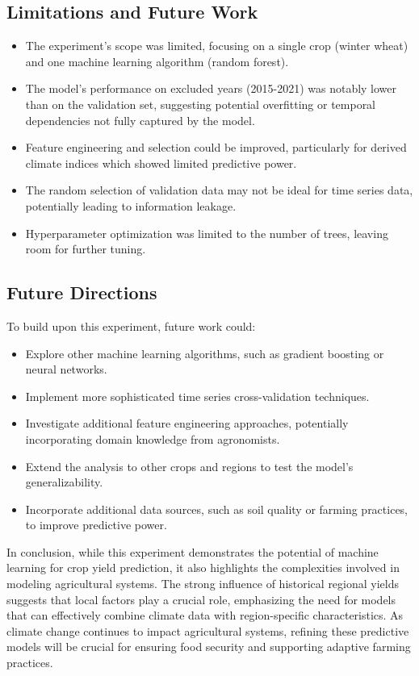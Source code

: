 \documentclass{article}
\begin{document}
\subsection{Limitations and Future Work}
\begin{itemize}
	\item The experiment's scope was limited, focusing on a single crop (winter wheat) and one machine learning algorithm (random forest).
	\item The model's performance on excluded years (2015-2021) was notably lower than on the validation set, suggesting potential overfitting or temporal dependencies not fully captured by the model.
	\item Feature engineering and selection could be improved, particularly for derived climate indices which showed limited predictive power.
	\item The random selection of validation data may not be ideal for time series data, potentially leading to information leakage.
	\item Hyperparameter optimization was limited to the number of trees, leaving room for further tuning.
\end{itemize}

\subsection{Future Directions}
To build upon this experiment, future work could:
\begin{itemize}
	\item Explore other machine learning algorithms, such as gradient boosting or neural networks.
	\item Implement more sophisticated time series cross-validation techniques.
	\item Investigate additional feature engineering approaches, potentially incorporating domain knowledge from agronomists.
	\item Extend the analysis to other crops and regions to test the model's generalizability.
	\item Incorporate additional data sources, such as soil quality or farming practices, to improve predictive power.
\end{itemize}

In conclusion, while this experiment demonstrates the potential of machine learning for crop yield prediction, it also highlights the complexities involved in modeling agricultural systems. The strong influence of historical regional yields suggests that local factors play a crucial role, emphasizing the need for models that can effectively combine climate data with region-specific characteristics. As climate change continues to impact agricultural systems, refining these predictive models will be crucial for ensuring food security and supporting adaptive farming practices.
\end{document}

